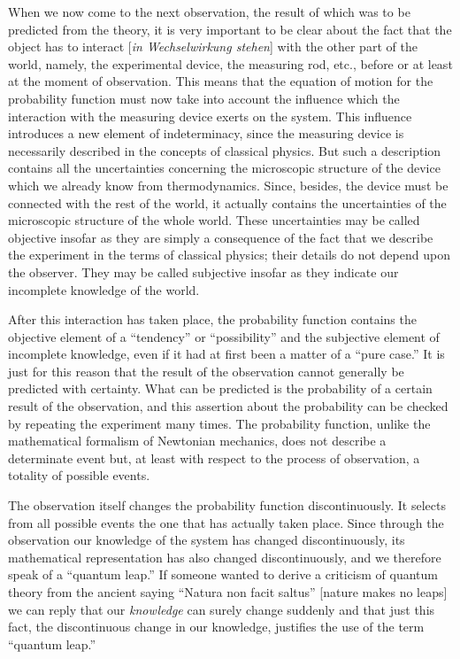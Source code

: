 When we now come to the next observation, the result of which was to be
predicted from the theory, it is very important to be clear about the
fact that the object has to interact {[}\emph{in Wechselwirkung
stehen}{]} with the other part of the world, namely, the experimental
device, the measuring rod, etc., before or at least at the moment of
observation. This means that the equation of motion for the probability
function must now take into account the influence which the interaction
with the measuring device exerts on the system. This influence
introduces a new element of indeterminacy, since the measuring device is
necessarily described in the concepts of classical physics. But such a
description contains all the uncertainties concerning the microscopic
structure of the device which we already know from thermodynamics.
Since, besides, the device must be connected with the rest of the world,
it actually contains the uncertainties of the microscopic structure of
the whole world. These uncertainties may be called objective insofar as
they are simply a consequence of the fact that we describe the
experiment in the terms of classical physics; their details do not
depend upon the observer. They may be called subjective insofar as they
indicate our incomplete knowledge of the world.

After this interaction has taken place, the probability function
contains the objective element of a ``tendency'' or ``possibility'' and
the subjective element of incomplete knowledge, even if it had at first
been a matter of a ``pure case.'' It is just for this reason that the
result of the observation cannot generally be predicted with certainty.
What can be predicted is the probability of a certain result of the
observation, and this assertion about the probability can be checked by
repeating the experiment many times. The probability function, unlike
the mathematical formalism of Newtonian mechanics, does not describe a
determinate event but, at least with respect to the process of
observation, a totality of possible events.

The observation itself changes the probability function discontinuously.
It selects from all possible events the one that has actually taken
place. Since through the observation our knowledge of the system has
changed discontinuously, its mathematical representation has also
changed discontinuously, and we therefore speak of a ``quantum leap.''
If someone wanted to derive a criticism of quantum theory from the
ancient saying ``Natura non facit saltus'' {[}nature makes no leaps{]}
we can reply that our \emph{knowledge} can surely change suddenly and
that just this fact, the discontinuous change in our knowledge,
justifies the use of the term ``quantum leap.''

